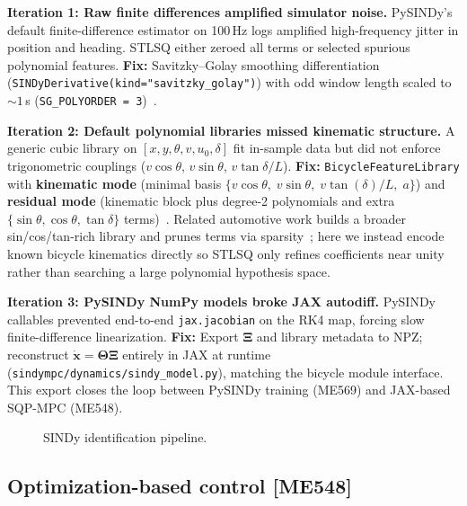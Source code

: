 \documentclass[letterpaper, 10 pt, conference]{ieeeconf}  %
\begin{document}
\textbf{Iteration 1: Raw finite differences amplified simulator noise.}
PySINDy's default finite-difference estimator on 100\,Hz logs amplified high-frequency jitter in position and heading.
STLSQ either zeroed all terms or selected spurious polynomial features.
\textbf{Fix:} Savitzky--Golay smoothing differentiation (\texttt{SINDyDerivative(kind="savitzky\_golay")}) with odd window length scaled to ${\sim}1$\,s (\texttt{SG\_POLYORDER = 3})~\cite{Brunton2016SINDy,Corbetta2020}.

\textbf{Iteration 2: Default polynomial libraries missed kinematic structure.}
A generic cubic library on $[x, y, \theta, v, u_0, \delta]$ fit in-sample data but did not enforce trigonometric couplings ($v\cos\theta$, $v\sin\theta$, $v\tan\delta/L$).
\textbf{Fix:} \texttt{BicycleFeatureLibrary} with \textbf{kinematic mode} (minimal basis $\{v\cos\theta,\; v\sin\theta,\; v\tan(\delta)/L,\; a\}$) and \textbf{residual mode} (kinematic block plus degree-2 polynomials and extra $\{\sin\theta, \cos\theta, \tan\delta\}$ terms)~\cite{Corbetta2020}.
Related automotive work builds a broader sin/cos/tan-rich library and prunes terms via sparsity~\cite{Weihmayr2025SINDyMPC}; here we instead encode known bicycle kinematics directly so STLSQ only refines coefficients near unity rather than searching a large polynomial hypothesis space.

\textbf{Iteration 3: PySINDy NumPy models broke JAX autodiff.}
PySINDy callables prevented end-to-end \texttt{jax.jacobian} on the RK4 map, forcing slow finite-difference linearization.
\textbf{Fix:} Export $\boldsymbol{\Xi}$ and library metadata to NPZ; reconstruct $\dot{\mathbf{x}} = \boldsymbol{\Theta}\boldsymbol{\Xi}$ entirely in JAX at runtime (\texttt{sindympc/dynamics/sindy\_model.py}), matching the bicycle module interface.
This export closes the loop between PySINDy training (ME569) and JAX-based SQP-MPC (ME548).

\begin{figure}[t]
  \centering
  \caption{SINDy identification pipeline.}
  \label{fig:sindy_pipeline}
\end{figure}

\subsection{Optimization-based control [ME548]}
\end{document}

